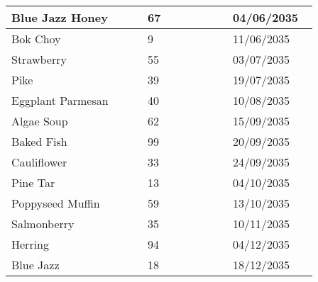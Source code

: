 \documentclass{article}
\begin{document}
\begin{longtable}{|p{0.4\linewidth}|p{0.25\linewidth}|p{0.25\linewidth}|}
Blue Jazz Honey & 67 & 04/06/2035 \\
\hline
Bok Choy & 9 & 11/06/2035 \\
\hline
Strawberry & 55 & 03/07/2035 \\
\hline
Pike & 39 & 19/07/2035 \\
\hline
Eggplant Parmesan & 40 & 10/08/2035 \\
\hline
Algae Soup & 62 & 15/09/2035 \\
\hline
Baked Fish & 99 & 20/09/2035 \\
\hline
Cauliflower & 33 & 24/09/2035 \\
\hline
Pine Tar & 13 & 04/10/2035 \\
\hline
Poppyseed Muffin & 59 & 13/10/2035 \\
\hline
Salmonberry & 35 & 10/11/2035 \\
\hline
Herring & 94 & 04/12/2035 \\
\hline
Blue Jazz & 18 & 18/12/2035 \\
\hline
\end{longtable}
\end{document}
